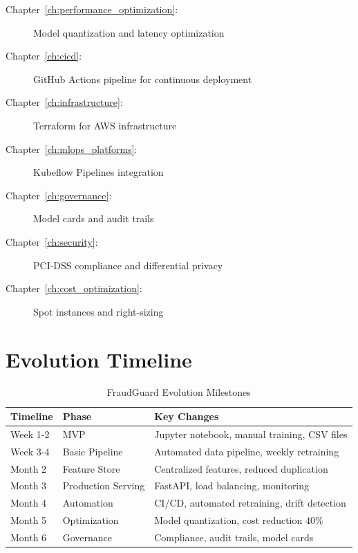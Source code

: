 \begin{description}
    \item[Chapter~\ref{ch:performance_optimization}:] Model quantization and latency optimization

    \item[Chapter~\ref{ch:cicd}:] GitHub Actions pipeline for continuous deployment

    \item[Chapter~\ref{ch:infrastructure}:] Terraform for AWS infrastructure

    \item[Chapter~\ref{ch:mlops_platforms}:] Kubeflow Pipelines integration

    \item[Chapter~\ref{ch:governance}:] Model cards and audit trails

    \item[Chapter~\ref{ch:security}:] PCI-DSS compliance and differential privacy

    \item[Chapter~\ref{ch:cost_optimization}:] Spot instances and right-sizing
\end{description}

\section{Evolution Timeline}

\begin{table}[h]
\centering
\caption{FraudGuard Evolution Milestones}
\begin{tabular}{@{}p{2cm}p{3cm}p{7cm}@{}}
\toprule
\textbf{Timeline} & \textbf{Phase} & \textbf{Key Changes} \\
\midrule
Week 1-2 & MVP & Jupyter notebook, manual training, CSV files \\
Week 3-4 & Basic Pipeline & Automated data pipeline, weekly retraining \\
Month 2 & Feature Store & Centralized features, reduced duplication \\
Month 3 & Production Serving & FastAPI, load balancing, monitoring \\
Month 4 & Automation & CI/CD, automated retraining, drift detection \\
Month 5 & Optimization & Model quantization, cost reduction 40\% \\
Month 6 & Governance & Compliance, audit trails, model cards \\
\bottomrule
\end{tabular}
\end{table}

